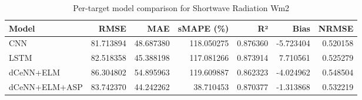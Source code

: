 \begin{table}
\caption{Per-target model comparison for Shortwave Radiation Wm2}
\begin{tabular}{lrrrrrr}
\toprule
Model & RMSE & MAE & sMAPE (\%) & R² & Bias & NRMSE \\
\midrule
CNN & 81.713894 & 48.687380 & 118.050275 & 0.876360 & -5.723404 & 0.520158 \\
LSTM & 82.518358 & 45.388198 & 117.081266 & 0.873914 & 7.710561 & 0.525279 \\
dCeNN+ELM & 86.304802 & 54.895963 & 119.609887 & 0.862323 & -4.024962 & 0.548504 \\
dCeNN+ELM+ASP & 83.742370 & 44.242262 & 38.710453 & 0.870377 & -1.313868 & 0.532219 \\
\bottomrule
\end{tabular}
\end{table}
